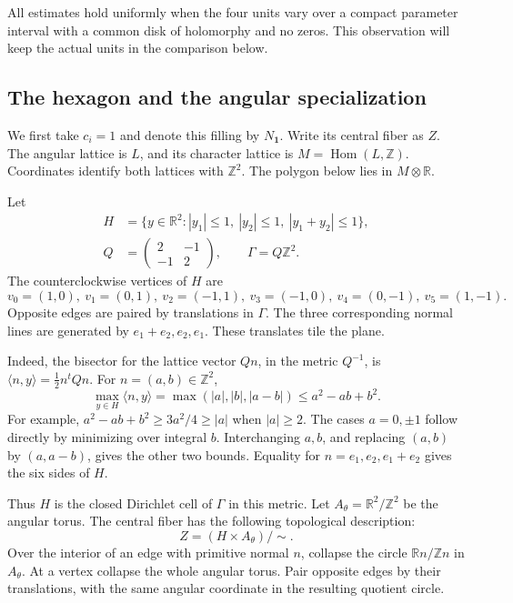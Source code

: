 All estimates hold uniformly when the four units vary over a compact
parameter interval with a common disk of holomorphy and no zeros.
This observation will keep the actual units in the comparison below.

\subsection{The hexagon and the angular specialization}

We first take $c_i=1$ and denote this filling by $N_{\mathbf1}$.
Write its central fiber as $Z$.
The angular lattice is $L$, and its character lattice is
$M=\operatorname{Hom}(L,\mathbb Z)$.
Coordinates identify both lattices with $\mathbb Z^2$.
The polygon below lies in $M\otimes\mathbb R$.

Let
\begin{equation}\label{c26:eq:hexagon}
\begin{split}
H&=\{y\in\mathbb R^2: |y_1|\le1,\ |y_2|\le1,\ |y_1+y_2|\le1\},\\
Q&=\begin{pmatrix}2&-1\\-1&2\end{pmatrix},\qquad \Gamma=Q\mathbb Z^2.
\end{split}
\end{equation}
The counterclockwise vertices of $H$ are
\[
v_0=(1,0),\ v_1=(0,1),\ v_2=(-1,1),\ v_3=(-1,0),\
v_4=(0,-1),\ v_5=(1,-1).
\]
Opposite edges are paired by translations in $\Gamma$.
The three corresponding normal lines are generated by
$e_1+e_2,e_2,e_1$.
These translates tile the plane.

Indeed, the bisector for the lattice vector $Qn$, in the metric $Q^{-1}$,
is $\langle n,y\rangle=\frac12n^tQn$.
For $n=(a,b)\in\mathbb Z^2$,
\[
\max_{y\in H}\langle n,y\rangle
 =\max(|a|,|b|,|a-b|)\le a^2-ab+b^2.
\]
For example, $a^2-ab+b^2\ge3a^2/4\ge|a|$ when $|a|\ge2$.
The cases $a=0,\pm1$ follow directly by minimizing over integral $b$.
Interchanging $a,b$, and replacing $(a,b)$ by $(a,a-b)$,
gives the other two bounds.
Equality for $n=e_1,e_2,e_1+e_2$ gives the six sides of $H$.

Thus $H$ is the closed Dirichlet cell of $\Gamma$ in this metric.
Let $A_\theta=\mathbb R^2/\mathbb Z^2$ be the angular torus.
The central fiber has the following topological description:
\begin{equation}\label{c26:eq:Z}
Z=(H\times A_\theta)/\sim.
\end{equation}
Over the interior of an edge with primitive normal $n$, collapse the
circle $\mathbb Rn/\mathbb Zn$ in $A_\theta$.
At a vertex collapse the whole angular torus.
Pair opposite edges by their translations, with the same angular
coordinate in the resulting quotient circle.

